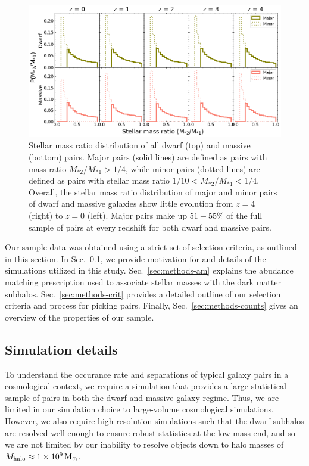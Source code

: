 \documentclass[twocolumn]{aastex631}
\newcommand{\ms}[1]{\ensuremath{M_{*{#1}}}}
\begin{document}
  \begin{figure}[htp]
    \centering
    \includegraphics[width=\textwidth]{stellarmass_distribution_1000.png}
    \caption{Stellar mass ratio distribution of all dwarf (top) and massive (bottom) pairs. Major pairs (solid lines) are defined as pairs with mass ratio $\ms{2}/\ms{1} > 1/4$, while minor pairs (dotted lines) are defined as pairs with stellar mass ratio $1/10<\ms{2}/\ms{1}<1/4$. Overall, the stellar mass ratio distribution of major and minor pairs of dwarf and massive galaxies show little evolution from $z=4$ (right) to $z=0$ (left). 
    Major pairs make up $51-55\%$ of the full sample of pairs at every redshift for both dwarf and massive pairs.}
    \label{fig:massratio}
  \end{figure}


Our sample data was obtained using a strict set of selection criteria, as outlined in this section.
In Sec.~\ref{sec:methods-sims}, we provide motivation for and details of the simulations utilized in this study.
Sec.~\ref{sec:methods-am} explains the abudance matching prescription used to associate stellar masses with the dark matter subhalos.
Sec.~\ref{sec:methods-crit} provides a detailed outline of our selection criteria and process for picking pairs.
Finally, Sec.~\ref{sec:methods-counts} gives an overview of the properties of our sample.

\subsection{Simulation details}\label{sec:methods-sims}
To understand the occurance rate and separations of typical galaxy pairs in a cosmological context, we require a simulation that provides a large statistical sample of pairs in both the dwarf and massive galaxy regime. 
Thus, we are limited in our simulation choice to large-volume cosmological simulations. 
However, we also require high resolution simulations such that the dwarf subhalos are resolved well enough to ensure robust statistics at the low mass end, and so we are not limited by our inability to resolve objects down to halo masses of $M_{\rm halo}\approx1\times 10^9\, \mathrm{M}_\odot$.
\end{document}
